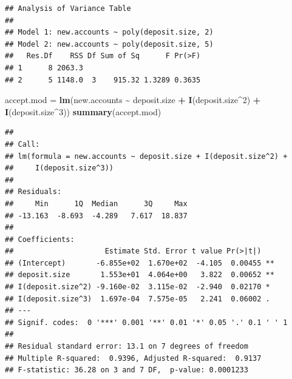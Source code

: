 \documentclass[
]{article}
\newenvironment{Shaded}{\begin{snugshade}}{\end{snugshade}}
\newcommand{\DecValTok}[1]{\textcolor[rgb]{0.00,0.00,0.81}{#1}}
\newcommand{\FunctionTok}[1]{\textcolor[rgb]{0.13,0.29,0.53}{\textbf{#1}}}
\newcommand{\NormalTok}[1]{#1}
\newcommand{\OtherTok}[1]{\textcolor[rgb]{0.56,0.35,0.01}{#1}}
\newcommand{\SpecialCharTok}[1]{\textcolor[rgb]{0.81,0.36,0.00}{\textbf{#1}}}
\begin{document}
\begin{verbatim}
## Analysis of Variance Table
## 
## Model 1: new.accounts ~ poly(deposit.size, 2)
## Model 2: new.accounts ~ poly(deposit.size, 5)
##   Res.Df    RSS Df Sum of Sq      F Pr(>F)
## 1      8 2063.3                           
## 2      5 1148.0  3    915.32 1.3289 0.3635
\end{verbatim}

\begin{Shaded}
\begin{Highlighting}[]
\NormalTok{accept.mod }\OtherTok{=} \FunctionTok{lm}\NormalTok{(new.accounts }\SpecialCharTok{\textasciitilde{}}\NormalTok{ deposit.size }\SpecialCharTok{+} \FunctionTok{I}\NormalTok{(deposit.size}\SpecialCharTok{\^{}}\DecValTok{2}\NormalTok{) }\SpecialCharTok{+} \FunctionTok{I}\NormalTok{(deposit.size}\SpecialCharTok{\^{}}\DecValTok{3}\NormalTok{))}
\FunctionTok{summary}\NormalTok{(accept.mod)}
\end{Highlighting}
\end{Shaded}

\begin{verbatim}
## 
## Call:
## lm(formula = new.accounts ~ deposit.size + I(deposit.size^2) + 
##     I(deposit.size^3))
## 
## Residuals:
##     Min      1Q  Median      3Q     Max 
## -13.163  -8.693  -4.289   7.617  18.837 
## 
## Coefficients:
##                     Estimate Std. Error t value Pr(>|t|)   
## (Intercept)       -6.855e+02  1.670e+02  -4.105  0.00455 **
## deposit.size       1.553e+01  4.064e+00   3.822  0.00652 **
## I(deposit.size^2) -9.160e-02  3.115e-02  -2.940  0.02170 * 
## I(deposit.size^3)  1.697e-04  7.575e-05   2.241  0.06002 . 
## ---
## Signif. codes:  0 '***' 0.001 '**' 0.01 '*' 0.05 '.' 0.1 ' ' 1
## 
## Residual standard error: 13.1 on 7 degrees of freedom
## Multiple R-squared:  0.9396, Adjusted R-squared:  0.9137 
## F-statistic: 36.28 on 3 and 7 DF,  p-value: 0.0001233
\end{verbatim}
\end{document}
